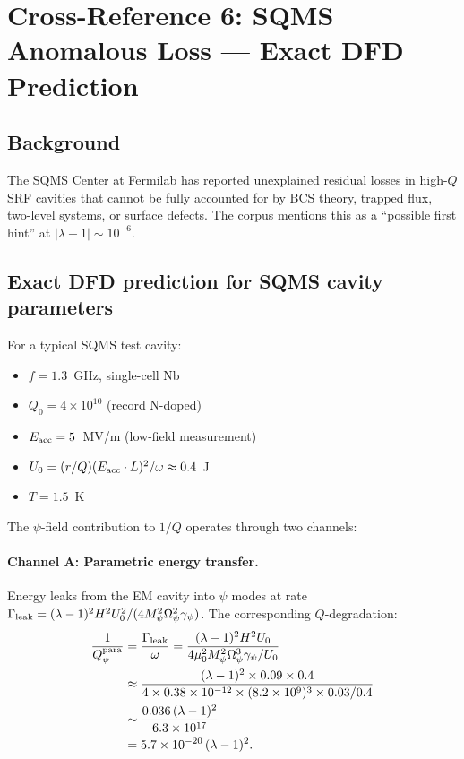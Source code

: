 \documentclass[11pt,twocolumn]{article}
\newcommand{\lam}{\lambda}
\newcommand{\Opsi}{\Omega_\psi}
\newcommand{\gpsi}{\gamma_\psi}
\newcommand{\Mpsi}{M_\psi}
\begin{document}
\section{Cross-Reference 6: SQMS Anomalous Loss --- Exact DFD Prediction}
\label{sec:sqms}

\subsection{Background}

The SQMS Center at Fermilab has reported unexplained residual losses
in high-$Q$ SRF cavities that cannot be fully accounted for by BCS
theory, trapped flux, two-level systems, or surface defects. The
corpus mentions this as a ``possible first hint'' at
$|\lam-1| \sim 10^{-6}$.

\subsection{Exact DFD prediction for SQMS cavity parameters}

For a typical SQMS test cavity:
\begin{itemize}[nosep]
\item $f = 1.3$~GHz, single-cell Nb
\item $Q_0 = 4\times10^{10}$ (record N-doped)
\item $E_{\rm acc} = 5$~MV/m (low-field measurement)
\item $U_0 = (r/Q)(E_{\rm acc}\cdot L)^2/\omega \approx 0.4$~J
\item $T = 1.5$~K
\end{itemize}

The $\psi$-field contribution to $1/Q$ operates through two channels:

\paragraph{Channel A: Parametric energy transfer.}
Energy leaks from the EM cavity into $\psi$ modes at rate
$\Gamma_{\rm leak} = (\lam-1)^2 H^2 U_0^2/(4\Mpsi^2\Opsi^2\gpsi)$.
The corresponding $Q$-degradation:
\begin{align}
\frac{1}{Q_\psi^{\rm para}} &= \frac{\Gamma_{\rm leak}}{\omega}
= \frac{(\lam-1)^2 H^2 U_0}{4\mu_0^2\Mpsi^2\Opsi^3\gpsi/U_0}
\nonumber\\
&\approx \frac{(\lam-1)^2 \times 0.09 \times 0.4}
{4 \times 0.38 \times 10^{-12} \times (8.2\times10^9)^3 \times 0.03 / 0.4}
\nonumber\\
&\sim \frac{0.036\,(\lam-1)^2}{6.3\times10^{17}}
\nonumber\\
&= 5.7\times10^{-20}\,(\lam-1)^2.
\end{align}
\end{document}
